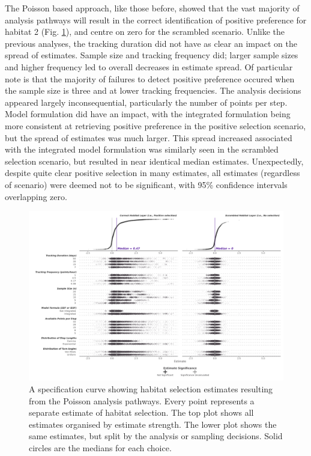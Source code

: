 \documentclass[10pt,a4paper]{article}
\begin{document}
The Poisson based approach, like those before, showed that the vast majority of analysis pathways will result in the correct identification of positive preference for habitat 2 (Fig. \ref{fig:specCurvePois}), and centre on zero for the scrambled scenario.
Unlike the previous analyses, the tracking duration did not have as clear an impact on the spread of estimates.
Sample size and tracking frequency did; larger sample sizes and higher frequency led to overall decreases in estimate spread.
Of particular note is that the majority of failures to detect positive preference occured when the sample size is three and at lower tracking frequencies.
The analysis decisions appeared largely inconsequential, particularly the number of points per step.
Model formulation did have an impact, with the integrated formulation being more consistent at retrieving positive preference in the positive selection scenario, but the spread of estimates was much larger.
This spread increased associated with the integrated model formulation was similarly seen in the scrambled selection scenario, but resulted in near identical median estimates.
Unexpectedly, despite quite clear positive selection in many estimates, all estimates (regardless of scenario) were deemed not to be significant, with 95\% confidence intervals overlapping zero.

\begin{figure}
\includegraphics[width=1\linewidth]{../figures/pois_specCurve} \caption{A specification curve showing habitat selection estimates resulting from the Poisson analysis pathways. Every point represents a separate estimate of habitat selection. The top plot shows all estimates organised by estimate strength. The lower plot shows the same estimates, but split by the analysis or sampling decisions. Solid circles are the medians for each choice.}\label{fig:specCurvePois}
\end{figure}
\end{document}
